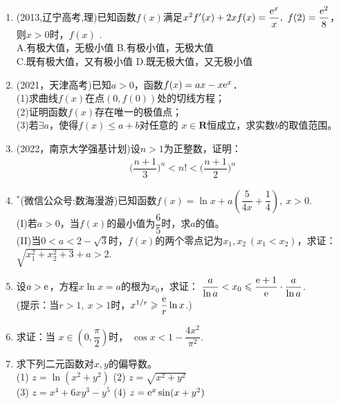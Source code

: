 \begin{enumerate}[label={\textbf{\arabic*.}},leftmargin=
    \inteval{\myenumleftmargin}pt]
\item (2013,辽宁高考,理)已知函数$ f(x) $满足$ x^2f'(x)+2xf(x)=\dfrac{\e^x}{x},\ f(2)=\dfrac{\e^2}{8} $，则$ x>0 $时，$ f(x) $ \underline{\hspace{2cm}}. \\
A.有极大值，无极小值 \hspace{2cm}     B.有极小值，无极大值\\
C.既有极大值，又有极小值\hspace{1.4cm}  D.既无极大值，又无极小值

\item (2021，天津高考)已知$ a>0 $，函数$ f(x)=ax-x\mathrm{e}^x $．\\
(1)求曲线$ f(x) $在点$ (0,f(0)) $处的切线方程；\\
(2)证明函数$ f(x) $存在唯一的极值点；\\
(3)若$ \exists a $，使得$ f(x)\leq a+b $对任意的
$ x\in \textbf{R} $恒成立，求实数$ b $的取值范围。

\item (2022，南京大学强基计划)设$n>1$为正整数，证明：
\begin{align*}
    \Big(\dfrac{n+1}{3}\Big)^{n}<n!<\Big(\dfrac{n+1}{2}\Big)^{n}
\end{align*}

\item $ ^* $(微信公众号:数海漫游)已知函数$ f(x)=\ln x+a\left(\dfrac{5}{4x}+\dfrac{1}{4}\right),\ x>0 $.\\
(I)若$ a>0 $，当$ f(x) $的最小值为$ \dfrac{6}{5} $时，求$ a $的值。\\
(II)当$ 0<a<2-\sqrt{3} $时，$ f(x) $的两个零点记为$ x_1,x_2\ (x_1<x_2) $，求证：$ \sqrt{x_1^2+x_2^2+3}+a>2 $.

\item 设$ a>\mathrm{e} $，方程$ x\ln x=a $的根为$ x_0 $，求证：
$ \dfrac{a}{\ln a}<x_0\leqslant \dfrac{\mathrm{e}+1}{\mathrm{e}}\cdot \dfrac{a}{\ln a} $. \\
(提示：当$ r>1,\ x>1 $时，$ x^{1/r}\geqslant \dfrac{\mathrm{e}}{r}\ln x $.)

\item 求证：当 $ x\in \left(0,\dfrac{\pi}{2}\right) $时，
$ \cos x<1-\dfrac{4x^2}{\pi^2} $.

\item 求下列二元函数对$ x,y $的偏导数。\\
(1) $ z=\ln(x^2+y^2) $ \quad (2) $ z=\sqrt{x^2+y^2} $ \\
(3) $ z=x^4+6xy^3-y^5 $ \quad (4) $ z=\mathrm{e}^x\sin(x+y^2)  $ 


\end{enumerate}

